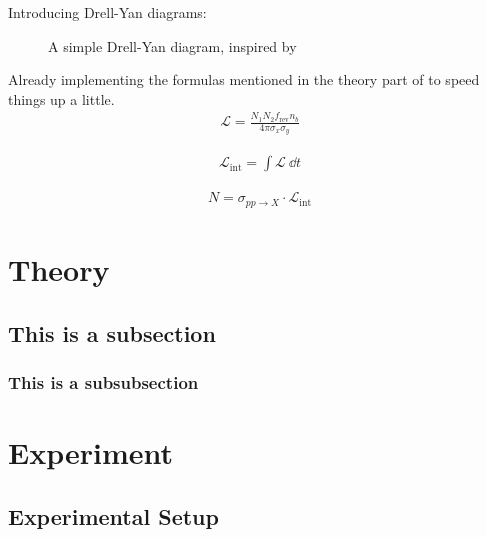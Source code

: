 \documentclass[twocolumn,
			   showpacs,%
               nofootinbib,
               aps,%
               prd,
               notitlepage,
               showkeys,
               10pt]{revtex4-1}
\begin{document}
Introducing Drell-Yan diagrams:
\begin{figure}[H]
\centering
	
\caption{A simple Drell-Yan diagram, inspired by \cite{F91manual}}
\end{figure}

Already implementing the formulas mentioned in the theory part of \cite{F91manual} to speed things up a little.
\begin{align}
\mathcal{L} = \frac{N_1N_2f_{\text{rev}}n_b}{4\pi\sigma_x\sigma_y}
\end{align}

\blindtext

\begin{align}
\mathcal{L}_{\text{int}} = \int \mathcal{L} \ \dd t	
\end{align}

\blindtext

\begin{align}
N = \sigma_{pp\rightarrow X} \cdot \mathcal{L}_{\text{int}}
\end{align}


\section{Theory}

\blindtext

\subsection{This is a subsection}

\subsubsection{This is a subsubsection}

\blindtext





\section{Experiment}




\subsection{Experimental Setup}


\blindtext
\end{document}
